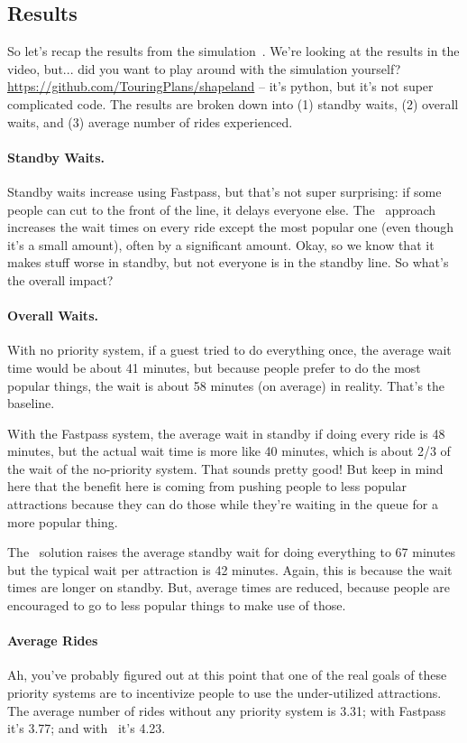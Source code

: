 \subsection*{Results}
So let's recap the results from the simulation~\cite{dldisney}. We're looking at the results in the video, but... did you want to play around with the simulation yourself? \url{https://github.com/TouringPlans/shapeland} -- it's python, but it's not super complicated code. The results are broken down into (1) standby waits, (2) overall waits, and (3) average number of rides experienced. 

\paragraph{Standby Waits.}
Standby waits increase using Fastpass, but that's not super surprising: if some people can cut to the front of the line, it delays everyone else. The \FPP~approach increases the wait times on every ride except the most popular one (even though it's a small amount), often by a significant amount. Okay, so we know that it makes stuff worse in standby, but not everyone is in the standby line. So what's the overall impact?

\paragraph{Overall Waits.}

With no priority system, if a guest tried to do everything once, the average wait time would be about 41 minutes, but because people prefer to do the most popular things, the wait is about 58 minutes (on average) in reality. That's the baseline.

With the Fastpass system, the average wait in standby if doing every ride is 48 minutes, but the actual wait time is more like 40 minutes, which is about 2/3 of the wait of the no-priority system. That sounds pretty good! But keep in mind here that the benefit here is coming from pushing people to less popular attractions because they can do those while they're waiting in the queue for a more popular thing. 

The \FPP~solution raises the average standby wait for doing everything to 67 minutes but the typical wait per attraction is 42 minutes. Again, this is because the wait times are longer on standby. But, average times are reduced, because people are encouraged to go to less popular things to make use of those.

\paragraph{Average Rides}
Ah, you've probably figured out at this point that one of the real goals of these priority systems are to incentivize people to use the under-utilized attractions. The average number of rides without any priority system is 3.31; with Fastpass it's 3.77; and with \FPP~it's 4.23. 

